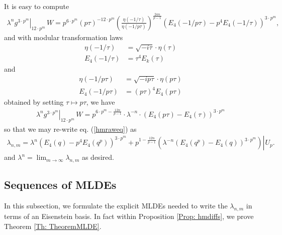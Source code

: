 \documentclass[10pt,a4paper]{amsart}
\numberwithin{equation}{section}
\theoremstyle{definition}
\newcommand{\haupt}{\lambda}
\newcommand{\upee}[1]{\left. #1 \right\rvert \hspace{1pt} U_{p}}
\begin{document}
It is easy to compute
\begin{align*}
    \left. \haupt^{n}g^{3 \cdot p^{m}} \right\rvert_{12 \cdot p^{m}} \hspace{2pt} W = p^{6 \cdot p^{m}} \left( p \tau \right)^{- 12 \cdot p^{m}} \left( \frac{\eta (-1/\tau)}{\eta (-1/p\tau)} \right)^{\frac{24n}{p-1}} \left( E_{4}(-1/p \tau) - p^{4} E_{4}(-1/\tau) \right)^{3 \cdot p^{m}},
\end{align*}
and with modular transformation laws
\begin{align*}
    \eta (-1/\tau) &= \sqrt{-i \tau} \cdot \eta ( \tau ) \\
    E_{4}(-1/ \tau) &= \tau^{4} E_{k}(\tau)
\end{align*}
and
\begin{align*}
    \eta (-1/ p\tau) &= \sqrt{-i p \tau} \cdot \eta ( p \tau ) \\
    E_{4} ( - 1 / p \tau ) &= (p \tau)^{4} E_{4}(p \tau)
\end{align*}
obtained by setting $\tau \mapsto p \tau$, we have
\begin{align*}
     \left. \haupt^{n}g^{3 \cdot p^{m}} \right\rvert_{12 \cdot p^{m}} \hspace{2pt} W = p^{6 \cdot p^{m} - \frac{12n}{p-1}} \cdot \haupt^{-n} \cdot \left( E_{4}(p \tau) - E_{4}(\tau) \right)^{3 \cdot p^{m}}
\end{align*}
so that we may re-write eq. (\ref{hmraweq}) as
\begin{align}
    \haupt_{n,m} = \haupt^{n}  \left( E_{4}(q) - p^{4} E_{4}(q^{p}) \right)^{3 \cdot p^{m}} + p^{1 - \frac{12n}{p-1}} \upee{ \left( \haupt^{-n} \left( E_{4}(q^{p}) - E_{4}(q) \right)^{3 \cdot p^{m}} \right) }.\label{hms}
\end{align}
and $\haupt^{n} = \lim_{m \to \infty} \haupt_{n,m}$ as desired.

\subsection{Sequences of MLDEs} \label{Subsection: Sequences of MLDES}

In this subsection, we formulate the explicit MLDEs needed to write the $\lambda_{n,m}$ in terms of an Eisenstein basis. In fact within Proposition \ref{Prop: hmdiffs}, we prove Theorem \ref{Th: TheoremMLDE}.
\end{document}
